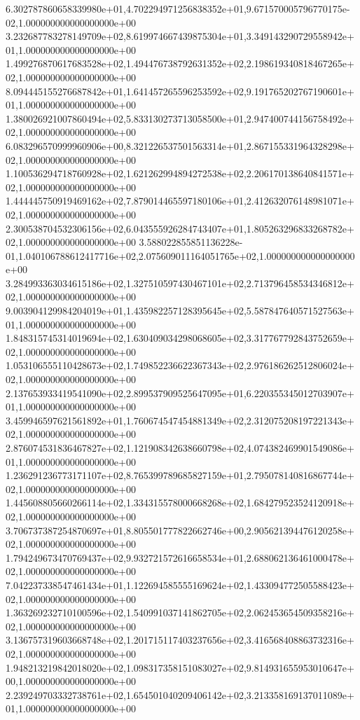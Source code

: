 6.302787860658339980e+01,4.702294971256838352e+01,9.671570005796770175e-02,1.000000000000000000e+00
3.232687783278149709e+02,8.619974667439875304e+01,3.349143290729558942e+01,1.000000000000000000e+00
1.499276870617683528e+02,1.494476738792631352e+02,2.198619340818467265e+02,1.000000000000000000e+00
8.094445155276687842e+01,1.641457265596253592e+02,9.191765202767190601e+01,1.000000000000000000e+00
1.380026921007860494e+02,5.833130273713058500e+01,2.947400744156758492e+02,1.000000000000000000e+00
6.083296570999960906e+00,8.321226537501563314e+01,2.867155331964328298e+02,1.000000000000000000e+00
1.100536294718760928e+02,1.621262994894272538e+02,2.206170138640841571e+02,1.000000000000000000e+00
1.444445750919469162e+02,7.879014465597180106e+01,2.412632076148981071e+02,1.000000000000000000e+00
2.300538704532306156e+02,6.043555926284743407e+01,1.805263296833268782e+02,1.000000000000000000e+00
3.588022855851136228e-01,1.040106788612417716e+02,2.075609011164051765e+02,1.000000000000000000e+00
3.284993363034615186e+02,1.327510597430467101e+02,2.713796458534346812e+02,1.000000000000000000e+00
9.003904129984204019e+01,1.435982257128395645e+02,5.587847640571527563e+01,1.000000000000000000e+00
1.848315745314019694e+02,1.630409034298068605e+02,3.317767792843752659e+02,1.000000000000000000e+00
1.053106555110428673e+02,1.749852236622367343e+02,2.976186262512806024e+02,1.000000000000000000e+00
2.137653933419541090e+02,2.899537909525647095e+01,6.220355345012703907e+01,1.000000000000000000e+00
3.459946597621561892e+01,1.760674547454881349e+02,2.312075208197221343e+02,1.000000000000000000e+00
2.876074531836467827e+02,1.121908342638660798e+02,4.074382469901549086e+01,1.000000000000000000e+00
1.236291236773171107e+02,8.765399789685827159e+01,2.795078140816867744e+02,1.000000000000000000e+00
1.445608805660266114e+02,1.334315578000668268e+02,1.684279523524120918e+02,1.000000000000000000e+00
3.706737387254870697e+01,8.805501777822662746e+00,2.905621394476120258e+02,1.000000000000000000e+00
1.794249673470769437e+02,9.932721572616658534e+01,2.688062136461000478e+02,1.000000000000000000e+00
7.042237338547461434e+01,1.122694585555169624e+02,1.433094772505588423e+02,1.000000000000000000e+00
1.363269232710100596e+02,1.540991037141862705e+02,2.062453654509358216e+02,1.000000000000000000e+00
3.136757319603668748e+02,1.201715117403237656e+02,3.416568408863732316e+02,1.000000000000000000e+00
1.948213219842018020e+02,1.098317358151083027e+02,9.814931655953010647e+00,1.000000000000000000e+00
2.239249703332738761e+02,1.654501040209406142e+02,3.213358169137011089e+01,1.000000000000000000e+00
